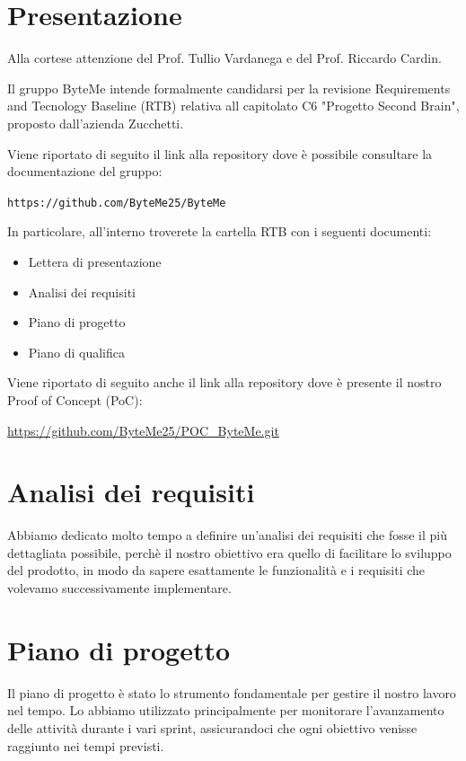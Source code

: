 \documentclass[11pt,a4paper]{article}
\begin{document}
\section{Presentazione}
Alla cortese attenzione del Prof. Tullio Vardanega e del Prof. Riccardo Cardin.

Il gruppo ByteMe intende formalmente candidarsi per la revisione Requirements and Tecnology Baseline (RTB) relativa all capitolato C6 "Progetto Second Brain", proposto dall'azienda Zucchetti.

Viene riportato di seguito il link alla repository dove è possibile consultare la documentazione del gruppo:
\begin{center}
\texttt{https://github.com/ByteMe25/ByteMe}
\end{center}

\noindent In particolare, all'interno troverete la cartella RTB con i seguenti documenti:
\begin{itemize}
    \item Lettera di presentazione
    \item Analisi dei requisiti
    \item Piano di progetto
    \item Piano di qualifica
\end{itemize}

\noindent Viene riportato di seguito anche il link alla repository dove è presente il nostro Proof of Concept (PoC):
\begin{center}
\url{https://github.com/ByteMe25/POC_ByteMe.git}
\end{center}

\newpage
\section{Analisi dei requisiti}
Abbiamo dedicato molto tempo a definire un’analisi dei requisiti che fosse il più dettagliata possibile, perchè il nostro obiettivo era quello di facilitare lo sviluppo del prodotto, in modo da sapere esattamente le funzionalità e i requisiti che volevamo successivamente implementare.

\section{Piano di progetto}
Il piano di progetto è stato lo strumento fondamentale per gestire il nostro lavoro nel tempo. Lo abbiamo utilizzato principalmente per monitorare l'avanzamento delle attività durante i vari sprint, assicurandoci che ogni obiettivo venisse raggiunto nei tempi previsti. 
\end{document}
